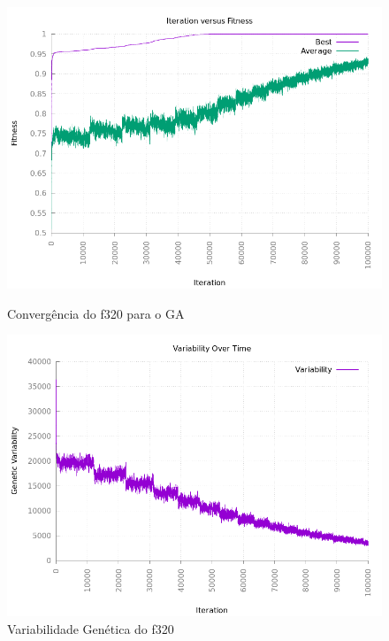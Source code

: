 \documentclass[12pt]{article}
\begin{document}
\begin{figure}[h!]
    \centering
    \begin{minipage}{0.45\textwidth}
        \centering
        \includegraphics[width=\textwidth]{pictures/f320convergence}
        \caption{Convergência do f320 para o GA}
    \end{minipage}
    \begin{minipage}{0.45\textwidth}
        \centering
        \includegraphics[width=\textwidth]{pictures/f320variability}
        \caption{Variabilidade Genética do f320}
    \end{minipage}
\end{figure}
\end{document}
